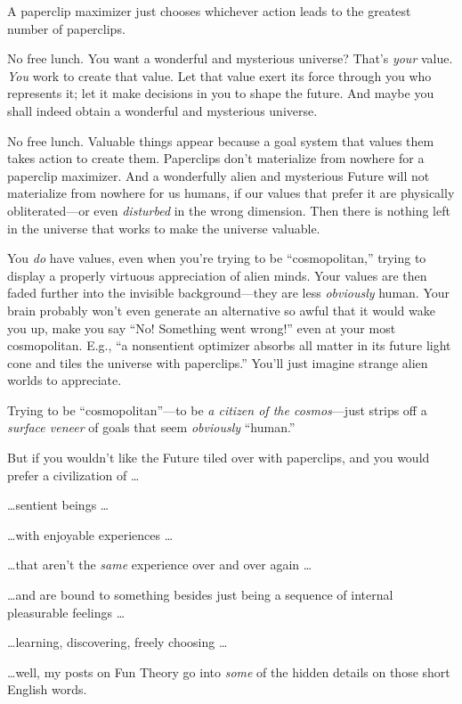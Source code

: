 {
 A paperclip maximizer just chooses whichever action leads to the
greatest number of paperclips.}

{
 No free lunch. You want a wonderful and mysterious universe?
That's \textit{your} value. \textit{You} work to create
that value. Let that value exert its force through you who represents
it; let it make decisions in you to shape the future. And maybe you
shall indeed obtain a wonderful and mysterious universe.}

{
 No free lunch. Valuable things appear because a goal system that
values them takes action to create them. Paperclips
don't materialize from nowhere for a paperclip
maximizer. And a wonderfully alien and mysterious Future will not
materialize from nowhere for us humans, if our values that prefer it
are physically obliterated---or even \textit{disturbed} in the wrong
dimension. Then there is nothing left in the universe that works to
make the universe valuable.}

{
 You \textit{do} have values, even when you're
trying to be ``cosmopolitan,''
trying to display a properly virtuous appreciation of alien minds. Your
values are then faded further into the invisible background{}---they
are less \textit{obviously} human. Your brain probably
won't even generate an alternative so awful that it
would wake you up, make you say ``No! Something went
wrong!'' even at your most cosmopolitan. E.g.,
``a nonsentient optimizer absorbs all matter in its
future light cone and tiles the universe with
paperclips.'' You'll just imagine
strange alien worlds to appreciate.}

{
 Trying to be
``cosmopolitan''---to be \textit{a
citizen of the cosmos}{}---just strips off a \textit{surface veneer} of
goals that seem \textit{obviously}
``human.''}

{
 But if you wouldn't like the Future tiled over
with paperclips, and you would prefer a civilization of \ldots}

{
 \ldots sentient beings \ldots}

{
 \ldots with enjoyable experiences \ldots}

{
 \ldots that aren't the \textit{same} experience
over and over again \ldots}

{
 \ldots and are bound to something besides just being a sequence of
internal pleasurable feelings \ldots}

{
 \ldots learning, discovering, freely choosing \ldots}

{
 \ldots well, my posts on Fun Theory go into \textit{some} of the
hidden details on those short English words.}


